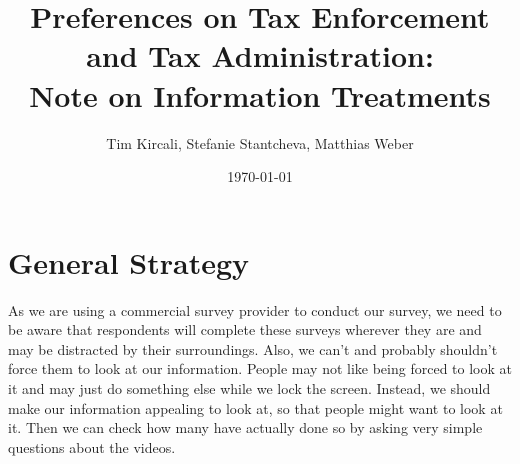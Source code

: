 \documentclass[11pt]{article}
\title{Preferences on Tax Enforcement and Tax Administration:\\Note on Information Treatments}
\author{Tim Kircali, Stefanie Stantcheva, Matthias Weber}
\date{\today} %
\begin{document}
\maketitle
\section{General Strategy}
As we are using a commercial survey provider to conduct our survey, we need to be aware that respondents will complete these surveys wherever they are and may be distracted by their surroundings. Also, we can't and probably shouldn't force them to look at our information. People may not like being forced to look at it and may just do something else while we lock the screen. Instead, we should make our information appealing to look at, so that people might want to look at it. Then we can check how many have actually done so by asking very simple questions about the videos.
\end{document}
